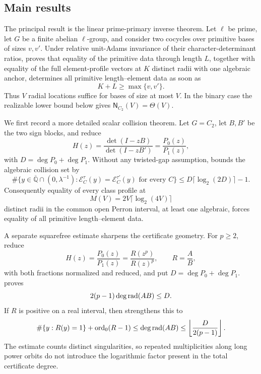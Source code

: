 \subsection{Main results}

The principal result is the linear prime-primary inverse theorem.  Let
\(\ell\) be prime, let \(G\) be a finite abelian \(\ell\)-group, and consider
two cocycles over primitive bases of sizes \(v,v'\).  Under relative
unit-Adams invariance of their character-determinant ratios,
 proves that equality of the
primitive data through length \(L\), together with equality of the full
element-profile vectors at \(K\) distinct radii with one algebraic anchor,
determines all primitive length--element data as soon as
\[
 K+L\ge\max\{v,v'\}.
\]
Thus \(V\) radial locations suffice for bases of size at most \(V\).  In the
binary case the realizable lower bound below gives
\(\mathsf N_{C_2}(V)=\Theta(V)\).

We first record a more detailed scalar collision theorem.  Let \(G=C_2\),
let \(B,B'\) be the two sign blocks, and reduce
\[
 H(z)=\frac{\det(I-zB)}{\det(I-zB')}=\frac{P_0(z)}{P_1(z)},
\]
with \(D=\deg P_0+\deg P_1\).  Without any twisted-gap assumption,
 bounds the algebraic collision set by
\begin{equation}\label{eq:intro-collision-bound}
 \#\{y\in\overline{\mathbb Q}\cap(0,\lambda^{-1}):
   \mathcal E_C^\tau(y)=\mathcal E_C^{\tau'}(y)
   \text{ for every }C\}
 \le D\lceil\log_2(2D)\rceil-1.
\end{equation}
Consequently equality of every class profile at
\begin{equation}\label{eq:intro-universal-sample-budget}
 M(V)=2V\lceil\log_2(4V)\rceil
\end{equation}
distinct radii in the common open Perron interval, at least one algebraic,
forces equality of all primitive length--element data.

A separate squarefree estimate sharpens the certificate geometry.  For
\(p\ge2\), reduce
\[
 H(z)=\frac{P_0(z)}{P_1(z)}=\frac{R(z^p)}{R(z)^p},
 \qquad R=\frac AB,
\]
with both fractions normalized and reduced, and put
\(D=\deg P_0+\deg P_1\).   proves
\begin{equation}\label{eq:intro-squarefree-bound}
 2(p-1)\deg\operatorname{rad}(AB)\le D.
\end{equation}
If \(R\) is positive on a real interval, then
 strengthens this to
\[
 \#\{y:R(y)=1\}+\operatorname{ord}_0(R-1)
 \le\deg\operatorname{rad}(AB)\le\left\lfloor\frac{D}{2(p-1)}\right\rfloor.
\]
The estimate counts distinct singularities, so repeated multiplicities along
long power orbits do not introduce the logarithmic factor present in the
total certificate degree.

